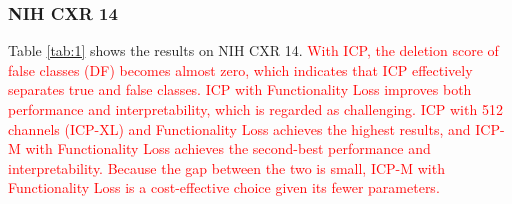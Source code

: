 \documentclass[preprint,7pt, a4paper]{elsarticle}
\begin{document}
\subsubsection{NIH CXR 14}

Table \ref{tab:1} shows the results on NIH CXR 14. \textcolor{red}{With ICP, the deletion score of false classes (DF) becomes almost zero, which indicates that ICP effectively separates true and false classes. ICP with Functionality Loss improves both performance and interpretability, which is regarded as challenging. ICP with 512 channels (ICP-XL) and Functionality Loss achieves the highest results, and ICP-M with Functionality Loss achieves the second-best performance and interpretability. Because the gap between the two is small, ICP-M with Functionality Loss is a cost-effective choice given its fewer parameters.}
\end{document}
